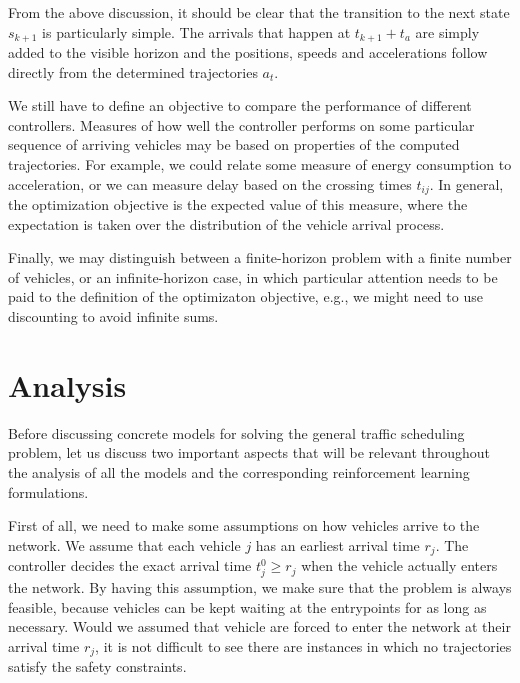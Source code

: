 \documentclass{article}
\theoremstyle{definition}
\theoremstyle{plain}
\begin{document}
From the above discussion, it should be clear that the transition to the next
state $s_{k+1}$ is particularly simple. The arrivals that happen at
$t_{k+1} + t_{a}$ are simply added to the visible horizon and the positions,
speeds and accelerations follow directly from the determined trajectories
$a_{t}$.


We still have to define an objective to compare the performance of different
controllers. Measures of how well the controller performs on some particular
sequence of arriving vehicles may be based on properties of the computed
trajectories. For example, we could relate some measure of energy consumption to
acceleration, or we can measure delay based on the crossing times $t_{ij}$. In
general, the optimization objective is the expected value of this measure, where
the expectation is taken over the distribution of the vehicle arrival process.

Finally, we may distinguish between a finite-horizon problem with a finite
number of vehicles, or an infinite-horizon case, in which particular attention
needs to be paid to the definition of the optimizaton objective, e.g., we might
need to use discounting to avoid infinite sums.


\section{Analysis}

Before discussing concrete models for solving the general traffic scheduling
problem, let us discuss two important aspects that will be relevant throughout
the analysis of all the models and the corresponding reinforcement learning
formulations.


First of all, we need to make some assumptions on how vehicles arrive to the
network. We assume that each vehicle $j$ has an earliest arrival time $r_j$. The
controller decides the exact arrival time $t^{0}_j \geq r_j$ when the vehicle
actually enters the network. By having this assumption, we make sure that the
problem is always feasible, because vehicles can be kept waiting at the
entrypoints for as long as necessary. Would we assumed that vehicle are forced
to enter the network at their arrival time $r_j$, it is not difficult to see
there are instances in which no trajectories satisfy the safety constraints.
\end{document}
